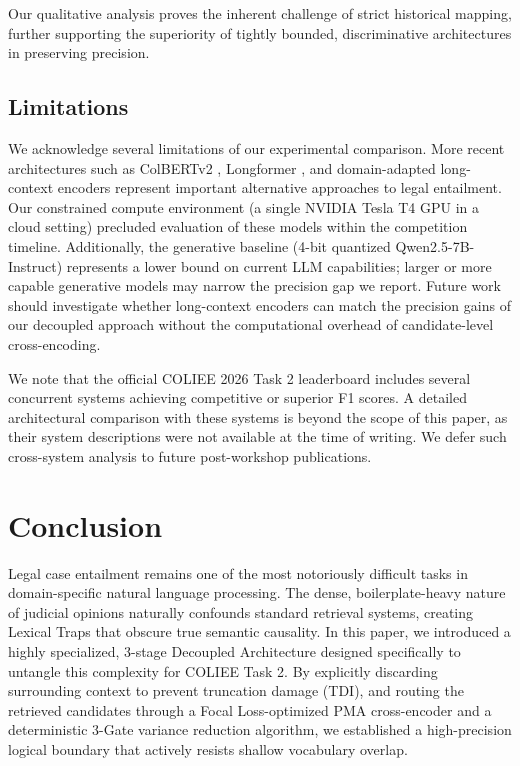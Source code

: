 \documentclass[sigconf]{acmart}
\newcommand{\rev}[1]{{\color{blue}#1}}
\begin{document}
Our qualitative analysis proves the inherent challenge of strict historical mapping, further supporting the superiority of tightly bounded, discriminative architectures in preserving precision.

\rev{\subsection{Limitations}

We acknowledge several limitations of our experimental comparison. More recent architectures such as ColBERTv2 \cite{santhanam2022colbertv2}, Longformer \cite{beltagy2020longformer}, and domain-adapted long-context encoders represent important alternative approaches to legal entailment. Our constrained compute environment (a single NVIDIA Tesla T4 GPU in a cloud setting) precluded evaluation of these models within the competition timeline. Additionally, the generative baseline (4-bit quantized Qwen2.5-7B-Instruct) represents a lower bound on current LLM capabilities; larger or more capable generative models may narrow the precision gap we report. Future work should investigate whether long-context encoders can match the precision gains of our decoupled approach without the computational overhead of candidate-level cross-encoding.


We note that the official COLIEE 2026 Task 2 leaderboard includes several concurrent systems achieving competitive or superior F1 scores. A detailed architectural comparison with these systems is beyond the scope of this paper, as their system descriptions were not available at the time of writing. We defer such cross-system analysis to future post-workshop publications.}


\section{Conclusion}

Legal case entailment remains one of the most notoriously difficult tasks in domain-specific natural language processing. The dense, boilerplate-heavy nature of judicial opinions naturally confounds standard retrieval systems, creating Lexical Traps that obscure true semantic causality. In this paper, we introduced a highly specialized, 3-stage Decoupled Architecture designed specifically to untangle this complexity for COLIEE Task 2. By explicitly discarding surrounding context to prevent truncation damage (TDI), and routing the retrieved candidates through a Focal Loss-optimized PMA cross-encoder and a deterministic 3-Gate variance reduction algorithm, we established a high-precision logical boundary that actively resists shallow vocabulary overlap. 
\end{document}
